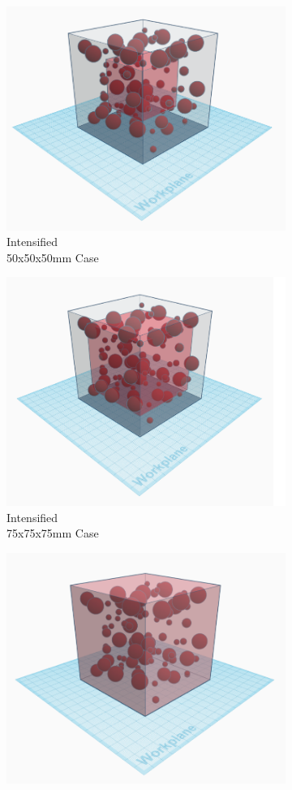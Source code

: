 \begin{figure}[ht]
\centering
    \begin{subfigure}{.33\textwidth}
      \centering
      \includegraphics[width=.8\linewidth]{Files/DEF_X/X0_3d.png}
      \caption{Intensified  \\ 50x50x50mm Case}
    \end{subfigure}%
    \begin{subfigure}{.33\textwidth}
      \centering
      \includegraphics[width=.8\linewidth]{Files/DEF_X/X-5_3d.png}
      \caption{Intensified  \\ 75x75x75mm Case}
    \end{subfigure}%
    \begin{subfigure}{.33\textwidth}
      \centering
      \includegraphics[width=.8\linewidth]{Files/DEF_X/X-1_3d.png}

\end{subfigure}
\end{figure}
